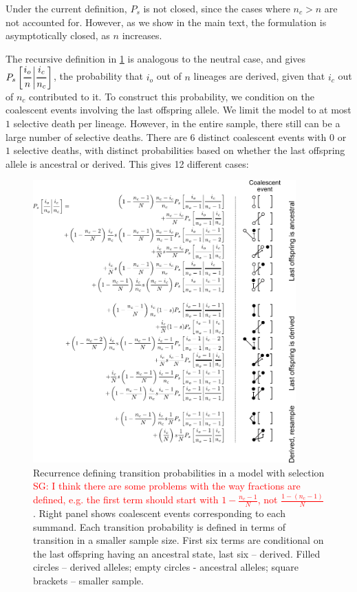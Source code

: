 \documentclass[review]{elsarticle}
\newcommand{\Dfrac}[2]{%
  \ooalign{%
    $\genfrac{}{}{1.2pt}0{#1}{#2}$\cr%
    $\color{white}\genfrac{}{}{.4pt}0{\phantom{#1}}{\phantom{#2}}$}%
}
\newcommand{\cond}{\middle\vert}
\newcommand{\sgcomment}[1]{\textcolor{red}{SG: #1}}
\begin{document}
Under the current definition, $P_s$ is not closed, since the cases where $n_c>n$ are not accounted
for. However, as we show in the main text, the formulation is asymptotically closed, as $n$ increases.

The recursive definition in \ref{fig:rec-selection} is analogous to the neutral case, and gives
$P_s\left[ \Dfrac{i_o}{n} \cond \Dfrac{i_c}{n_c} \right]$, the probability that $i_o$ out of $n$
lineages are derived, given that $i_c$ out of $n_c$ contributed to it. To construct this
probability, we condition on the coalescent events involving the last offspring allele. We limit the
model to at most $1$ selective death per lineage. However, in the entire sample, there still can be
a large number of selective deaths. There are 6 distinct coalescent events with $0$ or $1$ selective
deaths, with distinct probabilities based on whether the last offspring allele is ancestral or
derived. This gives 12 different cases:


\begin{figure}
  \centering
  \includegraphics[width=0.9\textwidth]{fig/recurrence-selection-annotated.pdf}
  \caption{Recurrence defining transition probabilities in a model with selection \sgcomment{I think there are some problems with the way fractions are defined, e.g. the first term should start with $1-\frac{n_c-1}{N}$, not $\frac{1-(n_c-1)}{N}$ }. Right panel
    shows coalescent events corresponding to each summand. Each transition probability is defined in
    terms of transition in a smaller sample size. First six terms are conditional on the last
    offspring having an ancestral state, last six -- derived. Filled circles -- derived alleles;
    empty circles - ancestral alleles; square brackets -- smaller sample.}
  \label{fig:rec-selection}
\end{figure}
\end{document}
